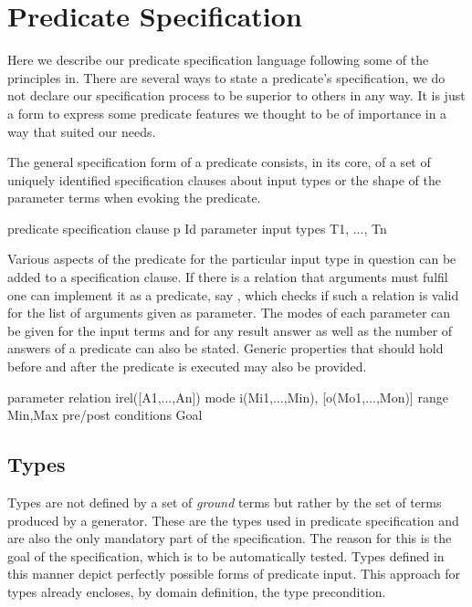 
\section{Predicate Specification}
\label{sec:pred-spec}

Here we describe our predicate specification language following some of
the principles in.
%
There are several ways to state a predicate's specification, we do not
declare our specification process to be superior to others in any way.
%
It is just a form to express some predicate features we thought to be of
importance in a way that suited our needs.


The general specification form of a predicate  consists, in its
core, of a set of uniquely identified specification clauses about input
types or the shape of the parameter terms when evoking the predicate.
%
\begin{code}
predicate specification clause
  p Id
parameter input types
  T1, ..., Tn
\end{code}
%
Various aspects of the predicate for the particular input type in
question can be added to a specification clause.
%
If there is a relation that arguments must fulfil one can implement it
as a predicate, say , which checks if such a relation is
valid for the list of arguments given as parameter.
%
The modes of each parameter can be given for the input terms and for any
result answer as well as the number of answers of a predicate can also
be stated.
%
Generic properties that should hold before and after the predicate is
executed may also be provided.
%
\begin{code}
parameter relation
  irel([A1,...,An])
mode
  i(Mi1,...,Min), [o(Mo1,...,Mon)]
range
  {Min,Max}
pre/post conditions
  Goal
\end{code}


\subsection{Types}

Types are not defined by a set of \emph{ground} terms but rather by
the set of terms produced by a generator.
%
These are the types used in predicate specification and are also
the only mandatory part of the specification.
%
The reason for this is the goal of the specification, which is to be
automatically tested.
%
Types defined in this manner depict perfectly possible forms of
predicate input.
%
This approach for types already encloses, by domain definition, the type
precondition.


